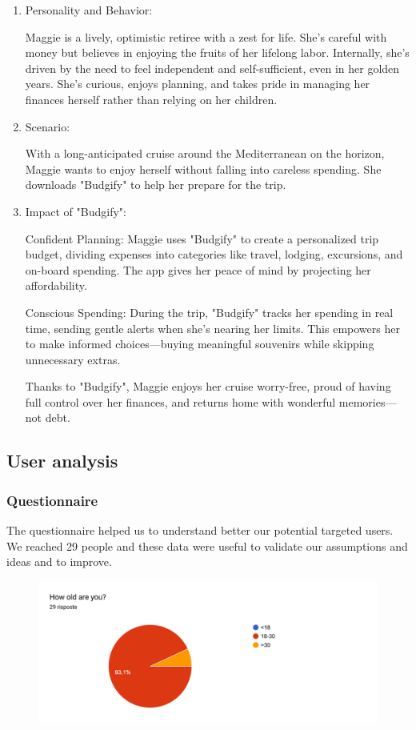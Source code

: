 \documentclass[a4paper,12pt]{article}
\begin{document}
\begin{enumerate}
    \item Personality and Behavior:
    
    Maggie is a lively, optimistic retiree with a zest for life. She’s careful with money but believes in enjoying the fruits of her lifelong labor. Internally, she’s driven by the need to feel independent and self-sufficient, even in her golden years. She's curious, enjoys planning, and takes pride in managing her finances herself rather than relying on her children.
    
    \item Scenario:
    
    With a long-anticipated cruise around the Mediterranean on the horizon, Maggie wants to enjoy herself without falling into careless spending. She downloads "Budgify" to help her prepare for the trip.
    
    \item Impact of "Budgify":
    
    Confident Planning: Maggie uses "Budgify" to create a personalized trip budget, dividing expenses into categories like travel, lodging, excursions, and on-board spending. The app gives her peace of mind by projecting her affordability.
    
    Conscious Spending: During the trip, "Budgify" tracks her spending in real time, sending gentle alerts when she’s nearing her limits. This empowers her to make informed choices—buying meaningful souvenirs while skipping unnecessary extras.
    
    Thanks to "Budgify", Maggie enjoys her cruise worry-free, proud of having full control over her finances, and returns home with wonderful memories—not debt.
\end{enumerate}
\subsection{User analysis}

\subsubsection{Questionnaire}
The questionnaire helped us to understand better our potential targeted users.
We reached 29 people and these data were useful to validate our assumptions and
ideas and to improve.
\begin{figure}[H]
    \centering
    \includegraphics[width=\linewidth]{imagequest9.jpg}
\end{figure}
\end{document}
